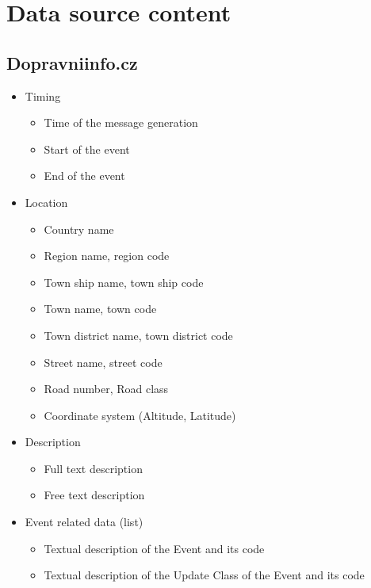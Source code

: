 \newline
\section{\label{app:infoContent}Data source content}

\subsection{Dopravniinfo.cz}
\begin{itemize}
\item Timing
	\begin{itemize}
	\item Time of the message generation
	\item Start of the event
	\item End of the event
	\end{itemize}
\item Location
    \begin{itemize}
    \item Country name
    \item Region name, region code
    \item Town ship name, town ship code
    \item Town name, town code
    \item Town district name, town district code
    \item Street name, street code
    \item Road number, Road class
    \item Coordinate system (Altitude, Latitude)
    \end{itemize}
\item Description
	\begin{itemize}
	\item Full text description 
	\item Free text description
	\end{itemize}
\item Event related data (list)
	\begin{itemize}
	\item Textual description of the Event and its code
	\item Textual description of the Update Class of the Event and its code
	\end{itemize}
\end{itemize}

